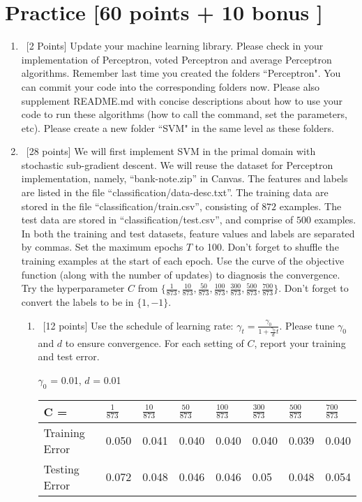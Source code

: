 \documentclass[12pt, fullpage,letterpaper]{article}
\begin{document}
\pagebreak

\section{Practice [60 points + 10 bonus ]}
\begin{enumerate}
	\item~[2 Points] Update your machine learning library. Please check in your implementation of Perceptron, voted Perceptron and average Perceptron algorithms. Remember last time you created the folders ``Perceptron". You can commit your code into the corresponding folders now. Please also supplement README.md with concise descriptions about how to use your code to run these algorithms (how to call the command, set the parameters, etc). Please create a new folder ``SVM" in the same level as these folders.  

	\item~[28 points] We will first implement SVM in the primal domain with stochastic sub-gradient descent. We will reuse the  dataset for Perceptron implementation, namely, ``bank-note.zip'' in Canvas. The features and labels are listed in the file ``classification/data-desc.txt''. The training data are stored in the file ``classification/train.csv'', consisting of $872$ examples. The test data are stored in ``classification/test.csv'', and comprise of $500$ examples. In both the training and test datasets, feature values and labels are separated by commas. Set the maximum epochs $T$ to 100. Don't forget to shuffle the training examples at the start of each epoch. Use the curve of the objective function (along with the number of updates) to diagnosis the convergence. Try the hyperparameter $C$ from $\{\frac{1}{873}, \frac{10}{873}, \frac{50}{873}, \frac{100}{873}, \frac{300}{873}, \frac{500}{873}, \frac{700}{873}\}$. Don't forget to convert the labels to be in $\{1, -1\}$.  
	\begin{enumerate}
		\item~[12 points] Use the schedule of learning rate: $\gamma_t = \frac{\gamma_0}{1+\frac{\gamma_0}{d}t}	$. Please tune $\gamma_0$ and $d$ to ensure convergence. For each setting of $C$, report your training and test error. 
		
		\bigskip
		$\gamma_0$ = 0.01, $d$ = 0.01 
		\begin{table}[h]
			\begin{tabular}{l||lllllll}
				C = & $\frac{1}{873}$ & $\frac{10}{873}$ & $\frac{50}{873}$ & $\frac{100}{873}$ & $\frac{300}{873}$ & $\frac{500}{873}$ & $\frac{700}{873}$ \\
				\hline\hline
				Training Error & 0.050 & 0.041 & 0.040 & 0.040 & 0.040 & 0.039 & 0.040 \\
				Testing Error & 0.072 & 0.048 & 0.046 & 0.046 & 0.05 & 0.048 & 0.054 \\
			\end{tabular}
		\end{table}
		

\end{enumerate}
\end{enumerate}
\end{document}
